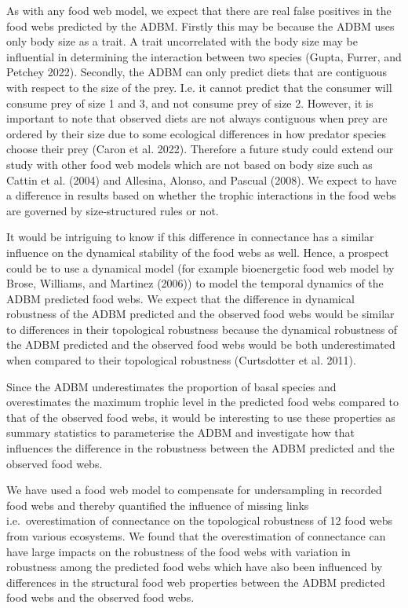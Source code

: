 \documentclass{article}
\begin{document}
As with any food web model, we expect that there are real false
positives in the food webs predicted by the ADBM. Firstly this may be
because the ADBM uses only body size as a trait. A trait uncorrelated
with the body size may be influential in determining the interaction
between two species (Gupta, Furrer, and Petchey 2022). Secondly, the
ADBM can only predict diets that are contiguous with respect to the size
of the prey. I.e. it cannot predict that the consumer will consume prey
of size 1 and 3, and not consume prey of size 2. However, it is
important to note that observed diets are not always contiguous when
prey are ordered by their size due to some ecological differences in how
predator species choose their prey (Caron et al. 2022). Therefore a
future study could extend our study with other food web models which are
not based on body size such as Cattin et al. (2004) and Allesina,
Alonso, and Pascual (2008). We expect to have a difference in results
based on whether the trophic interactions in the food webs are governed
by size-structured rules or not.

It would be intriguing to know if this difference in connectance has a
similar influence on the dynamical stability of the food webs as well.
Hence, a prospect could be to use a dynamical model (for example
bioenergetic food web model by Brose, Williams, and Martinez (2006)) to
model the temporal dynamics of the ADBM predicted food webs. We expect
that the difference in dynamical robustness of the ADBM predicted and
the observed food webs would be similar to differences in their
topological robustness because the dynamical robustness of the ADBM
predicted and the observed food webs would be both underestimated when
compared to their topological robustness (Curtsdotter et al. 2011).

Since the ADBM underestimates the proportion of basal species and
overestimates the maximum trophic level in the predicted food webs
compared to that of the observed food webs, it would be interesting to
use these properties as summary statistics to parameterise the ADBM and
investigate how that influences the difference in the robustness between
the ADBM predicted and the observed food webs.

We have used a food web model to compensate for undersampling in
recorded food webs and thereby quantified the influence of missing links
i.e.~overestimation of connectance on the topological robustness of 12
food webs from various ecosystems. We found that the overestimation of
connectance can have large impacts on the robustness of the food webs
with variation in robustness among the predicted food webs which have
also been influenced by differences in the structural food web
properties between the ADBM predicted food webs and the observed food
webs.
\end{document}
